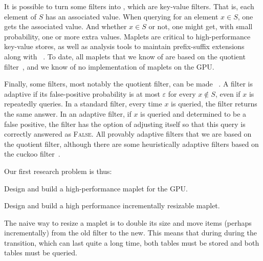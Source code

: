 It is possible to turn some filters into , which are key-value filters.  That is, each element of $S$ has an associated value.  When querying for an element $x\in S$, one gets the associated value.  And whether $x\in S$ or not, one might get, with small probability, one or more extra values.  Maplets are critical to high-performance key-value stores, as well as \kmer analysis tools to maintain prefix-suffix extensions along with \kmers~\cite{mccoy2022high}.  To date, all maplets that we know of are based on the quotient filter~\cite{conway2020splinterdb,mccoy2022high}, and we know of no implementation of maplets on the GPU\@.

Finally, some filters, most notably the quotient filter, can be made ~\cite{BenderFaGo18}.  A filter is adaptive if its false-positive probability is at most $\varepsilon$ for every $x\notin S$, even if $x$ is repeatedly queries.  In a standard filter, every time $x$ is queried, the filter returns the same answer.  In an adaptive filter, if $x$ is queried and determined to be a false positive, the filter has the option of adjusting itself so that this query is correctly answered as \textsc{False}.    All provably adaptive filters that we are based on the quotient filter, although there are some heuristically adaptive filters based on the cuckoo filter~\cite{mitzenmacher-adaptive}. 


Our first research problem is thus:

\begin{rproblem}
Design and build a high-performance maplet for the GPU\@.
\end{rproblem}


\begin{rproblem}\label{rprob:resizable-maplet}
Design and build a high performance incrementally resizable maplet.
\end{rproblem}
The naive way to resize a maplet is to double its size and move items (perhaps incrementally) from the old filter to the new.  This means that during during the transition, which can last quite a long time, both tables must be stored and both tables must be queried.

